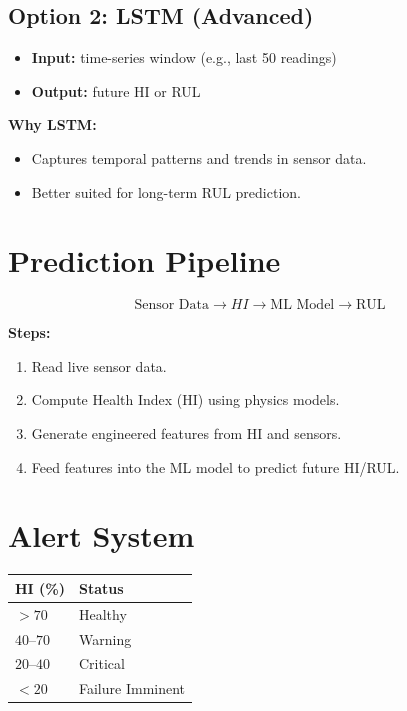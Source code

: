 \documentclass[12pt]{article}
\begin{document}
\subsection{Option 2: LSTM (Advanced)}

\begin{itemize}
  \item \textbf{Input:} time-series window (e.g., last 50 readings)
  \item \textbf{Output:} future HI or RUL
\end{itemize}

\textbf{Why LSTM:}
\begin{itemize}
  \item Captures temporal patterns and trends in sensor data.
  \item Better suited for long-term RUL prediction.
\end{itemize}


\section{Prediction Pipeline}

\[
\text{Sensor Data} \rightarrow HI \rightarrow \text{ML Model} \rightarrow \text{RUL}
\]

\textbf{Steps:}
\begin{enumerate}
  \item Read live sensor data.
  \item Compute Health Index (HI) using physics models.
  \item Generate engineered features from HI and sensors.
  \item Feed features into the ML model to predict future HI/RUL.
\end{enumerate}


\section{Alert System}

\begin{table}[h]
\centering
\begin{tabular}{ll}
\toprule
HI (\%) & Status \\
\midrule
$> 70$ & Healthy \\
$40$--$70$ & Warning \\
$20$--$40$ & Critical \\
$< 20$ & Failure Imminent \\
\bottomrule
\end{tabular}
\end{table}
\end{document}
